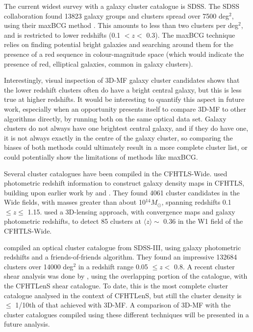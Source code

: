 The current widest survey with a galaxy cluster catalogue is SDSS. The SDSS collaboration found 13823 galaxy groups and clusters spread over 7500 deg$^2$, using their maxBCG method \citep{Koester07}. This amounts to less than two clusters per deg$^2$, and is restricted to lower redshifts (0.1 $< z <$ 0.3). The maxBCG technique relies on finding potential bright galaxies and searching around them for the presence of a red sequence in colour-magnitude space (which would indicate the presence of red, elliptical galaxies, common in galaxy clusters). 

Interestingly, visual inspection of \ac{3D-MF} galaxy cluster candidates shows that the lower redshift clusters often do have a bright central galaxy, but this is less true at higher redshifts. It would be interesting to quantify this aspect in future work, especially when an opportunity presents itself to compare \ac{3D-MF} to other algorithms directly, by running both on the same optical data set. Galaxy clusters do not always have one brightest central galaxy, and if they do have one, it is not always exactly in the centre of the galaxy cluster, so comparing the biases of both methods could ultimately result in a more complete cluster list, or could potentially show the limitations of methods like maxBCG. 

Several cluster catalogues have been compiled in the \ac{CFHTLS}-Wide. \citet{Durret11} used photometric redshift information to construct galaxy density maps in \ac{CFHTLS}, building upon earlier work by \citet{Adami10} and \citet{Mazure07}. They found 4061 cluster candidates in the Wide fields, with masses greater than about 10$^{14} M_{\odot}$, spanning redshifts 0.1 $\le z \le$ 1.15. \citet{Shan12} used a 3D-lensing approach, with convergence maps and galaxy photometric redshifts, to detect 85 clusters at $\langle z \rangle \sim$ 0.36 in the W1 field of the \ac{CFHTLS}-Wide.

\citet{Wen12} compiled an optical cluster catalogue from SDSS-III, using galaxy photometric redshifts and a friends-of-friends algorithm. They found an impressive 132684 clusters over 14000 deg$^2$ in a redshift range 0.05 $\leq z <$ 0.8. A recent cluster shear analysis was done by \citet{Covone14}, using the overlapping portion of the \citet{Wen12} catalogue, with the \ac{CFHTLenS} shear catalogue. To date, this is the most complete cluster catalogue analysed in the context of \ac{CFHTLenS}, but still the cluster density is $\leq$ 1/10th of that achieved with \ac{3D-MF}. A comparison of \ac{3D-MF} with the cluster catalogues compiled using these different techniques will be presented in a future analysis.

